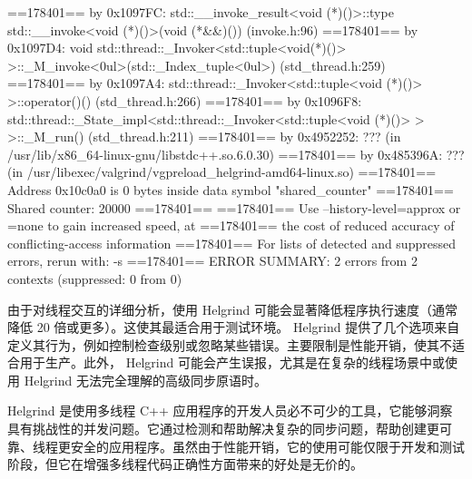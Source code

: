 \begin{shell}
==178401== by 0x1097FC: std::__invoke_result<void (*)()>::type
std::__invoke<void (*)()>(void (*&&)()) (invoke.h:96)
==178401== by 0x1097D4: void std::thread::_Invoker<std::tuple<void(*)()> >::_M_invoke<0ul>(std::_Index_tuple<0ul>) (std_thread.h:259)
==178401== by 0x1097A4: std::thread::_Invoker<std::tuple<void (*)()> >::operator()() (std_thread.h:266)
==178401== by 0x1096F8: std::thread::_State_impl<std::thread::_Invoker<std::tuple<void (*)()> > >::_M_run() (std_thread.h:211)
==178401== by 0x4952252: ??? (in /usr/lib/x86_64-linux-gnu/libstdc++.so.6.0.30)
==178401== by 0x485396A: ??? (in /usr/libexec/valgrind/vgpreload_helgrind-amd64-linux.so)
==178401== Address 0x10c0a0 is 0 bytes inside data symbol "shared_counter"
==178401==
Shared counter: 20000
==178401==
==178401== Use --history-level=approx or =none to gain increased
speed, at
==178401== the cost of reduced accuracy of conflicting-access
information
==178401== For lists of detected and suppressed errors, rerun with: -s
==178401== ERROR SUMMARY: 2 errors from 2 contexts (suppressed: 0 from
0)
\end{shell}


由于对线程交互的详细分析，使用 Helgrind 可能会显著降低程序执行速度（通常降低 20 倍或更多）。这使其最适合用于测试环境。 Helgrind 提供了几个选项来自定义其行为，例如控制检查级别或忽略某些错误。主要限制是性能开销，使其不适合用于生产。此外， Helgrind 可能会产生误报，尤其是在复杂的线程场景中或使用 Helgrind 无法完全理解的高级同步原语时。

Helgrind 是使用多线程 C++ 应用程序的开发人员必不可少的工具，它能够洞察具有挑战性的并发问题。它通过检测和帮助解决复杂的同步问题，帮助创建更可靠、线程更安全的应用程序。虽然由于性能开销，它的使用可能仅限于开发和测试阶段，但它在增强多线程代码正确性方面带来的好处是无价的。





















